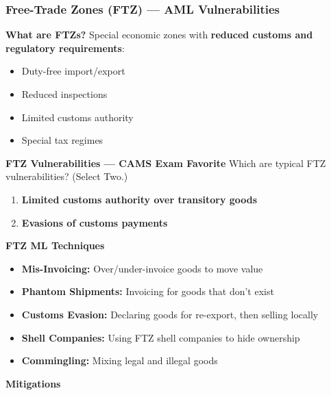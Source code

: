 \documentclass[12pt,aspectratio=169]{beamer}
\renewcommand{\scriptsize}{\fontsize{4.5}{5.5}\selectfont}
\begin{document}
	\begin{frame}
		\frametitle{\fontsize{11}{13}\selectfont \textbf{Free-Trade Zones (FTZ) — AML Vulnerabilities}}
		\begin{block}{\fontsize{7}{9}\selectfont \textbf{What are FTZs?}}
			\scriptsize
			Special economic zones with \textbf{reduced customs and regulatory requirements}:
			\begin{itemize}
				\item Duty-free import/export
				\item Reduced inspections
				\item Limited customs authority
				\item Special tax regimes
			\end{itemize}
		\end{block}
		\vspace{0.02cm}
		\begin{block}{\fontsize{7}{9}\selectfont \textbf{FTZ Vulnerabilities — CAMS Exam Favorite}}
			\scriptsize
			Which are typical FTZ vulnerabilities? (Select Two.)
			\begin{enumerate}
				\item \textbf{Limited customs authority over transitory goods}
				\item \textbf{Evasions of customs payments}
			\end{enumerate}
		\end{block}
		\vspace{0.02cm}
		\begin{block}{\fontsize{7}{9}\selectfont \textbf{FTZ ML Techniques}}
			\scriptsize
			\begin{itemize}
				\item \textbf{Mis-Invoicing:} Over/under-invoice goods to move value
				\item \textbf{Phantom Shipments:} Invoicing for goods that don't exist
				\item \textbf{Customs Evasion:} Declaring goods for re-export, then selling locally
				\item \textbf{Shell Companies:} Using FTZ shell companies to hide ownership
				\item \textbf{Commingling:} Mixing legal and illegal goods
			\end{itemize}
		\end{block}
		\vspace{0.02cm}
		\begin{block}{\fontsize{7}{9}\selectfont \textbf{Mitigations}}
			\scriptsize
			\begin{itemize}

\end{itemize}
\end{block}
\end{frame}
\end{document}

